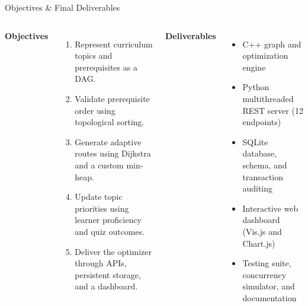 \documentclass[aspectratio=169,11pt]{beamer}
\begin{document}
\begin{frame}{Objectives \& Final Deliverables}
\begin{columns}[T,totalwidth=\textwidth]
\textbf{\color{GEUBlue}Objectives}
\begin{enumerate}\itemsep3pt
\item Represent curriculum topics and prerequisites as a DAG.
\item Validate prerequisite order using topological sorting.
\item Generate adaptive routes using Dijkstra and a custom min-heap.
\item Update topic priorities using learner proficiency and quiz outcomes.
\item Deliver the optimizer through APIs, persistent storage, and a dashboard.
\end{enumerate}
\textbf{\color{GEUBlue}Deliverables}
\begin{itemize}\itemsep3pt
\item C++ graph and optimization engine
\item Python multithreaded REST server (12 endpoints)
\item SQLite database, schema, and transaction auditing
\item Interactive web dashboard (Vis.js and Chart.js)
\item Testing suite, concurrency simulator, and documentation
\end{itemize}
\end{columns}
\end{frame}
\end{document}
